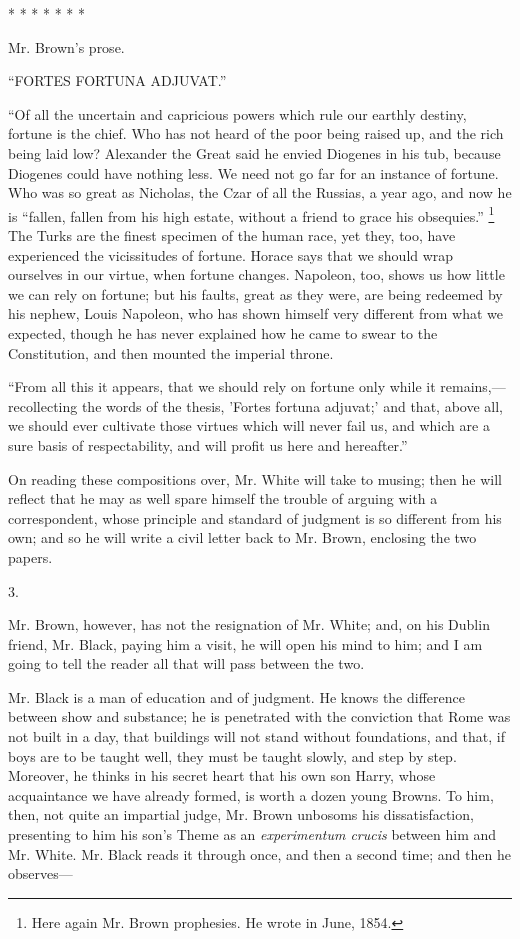 * *
* *
* * *

Mr. Brown's prose.

``FORTES FORTUNA ADJUVAT.''

``Of all the uncertain and capricious powers which rule our
earthly destiny, fortune is the chief. Who has not heard of the poor
being raised up, and the rich being laid low? Alexander the Great said
he envied Diogenes in his tub, because Diogenes could have nothing
less. We need not go far for an instance of fortune. Who was so great
as Nicholas, the Czar of all the Russias, a year ago, and now he is
``fallen, fallen from his high estate, without a friend to grace
his obsequies.'' \footnote{Here again Mr.
Brown prophesies. He wrote in June, 1854.} The Turks are the finest specimen of the human race, yet they,
too, have experienced the vicissitudes of fortune. Horace says that we
should wrap ourselves in our virtue, when fortune changes. Napoleon,
too, shows us how little we can rely on fortune; but his faults, great
as they were, are being redeemed by his nephew, Louis Napoleon, who
has shown himself very different from what we expected, though
he has never explained how he came to swear to the Constitution, and
then mounted the imperial throne.

``From all this it appears, that we should rely on fortune only
while it remains,—recollecting the words of the thesis, 'Fortes
fortuna adjuvat;' and that, above all, we should ever cultivate those
virtues which will never fail us, and which are a sure basis of
respectability, and will profit us here and hereafter.''

On reading these compositions over, Mr. White will take to musing;
then he will reflect that he may as well spare himself the trouble of
arguing with a correspondent, whose principle and standard of judgment
is so different from his own; and so he will write a civil letter back
to Mr. Brown, enclosing the two papers.

3.

Mr. Brown, however, has not the resignation of Mr. White; and, on
his Dublin friend, Mr. Black, paying him a visit, he will open his
mind to him; and I am going to tell the reader all that will pass
between the two.

Mr. Black is a man of education and of judgment. He knows the
difference between show and substance; he is penetrated with the
conviction that Rome was not built in a day, that buildings will not
stand without foundations, and that, if boys are to be taught well,
they must be taught slowly, and step by step. Moreover, he thinks in
his secret heart that his own son Harry, whose acquaintance we have
already formed, is worth a dozen young Browns. To him, then, not quite
an impartial judge, Mr. Brown unbosoms his dissatisfaction, presenting
to him his son's Theme as an \emph{experimentum crucis} between him
and Mr. White. Mr. Black reads it through once, and then a
second time; and then he observes—


